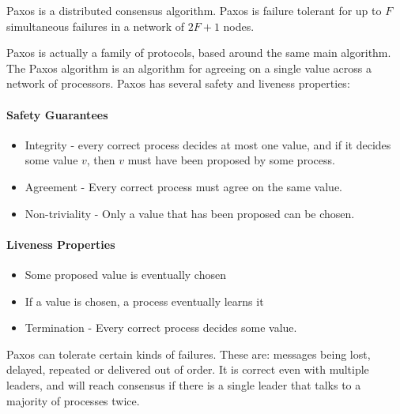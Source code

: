 \documentclass[12pt,twoside,notitlepage]{report}
\begin{document}
Paxos is a distributed consensus algorithm. Paxos is failure tolerant for up to $F$
simultaneous failures in a network of $2F + 1$ nodes.

Paxos is actually a family of protocols, based around the same main algorithm. The Paxos algorithm
is an algorithm for agreeing on a single value across a network of processors. Paxos has several
safety and liveness properties:

\paragraph{Safety Guarantees}

\begin{itemize}
\item Integrity - every correct process decides at most one value, and if it decides some value
	$v$, then $v$ must have been proposed by some process.
\item Agreement - Every correct process must agree on the same value.
\item Non-triviality - Only a value that has been proposed can be chosen.
\end{itemize}

%
%
%

\paragraph{Liveness Properties}

\begin{itemize}
\item Some proposed value is eventually chosen
\item If a value is chosen, a process eventually learns it
\item Termination - Every correct process decides some value.
\end{itemize}

Paxos can tolerate certain kinds of failures. These are: messages being lost, delayed, repeated or
delivered out of order. It is correct even with multiple leaders, and will reach consensus if
there is a single leader that talks to a majority of processes twice.
\end{document}
